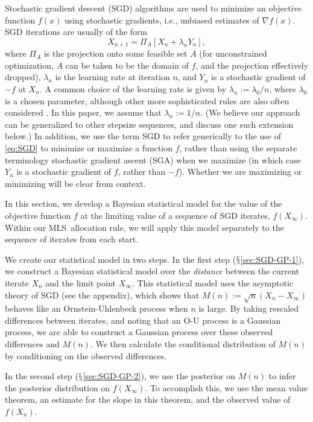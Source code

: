 \documentclass{wscpaperproc}
\theoremstyle{wsc}
\newcommand{\abbrv}{MLS}
\begin{document}
Stochastic gradient descent (SGD) algorithms are used to minimize an objective function $f(x)$ using stochastic gradients, i.e., unbiased estimates of $\nabla f(x)$. SGD iterations are usually of the form
\begin{equation}
X_{n+1}=\Pi_{A}\left[X_{n}+\lambda_{n}Y_{n}\right],\label{eq:SGD}
\end{equation}
where $\Pi_{A}$ is the projection onto some feasible set $A$ (for unconstrained optimization, $A$ can be taken to be the domain of $f$, and the projection effectively dropped),
$\lambda_{n}$ is the learning rate at iteration $n$, and $Y_{n}$ is a stochastic gradient of $-f$ at $X_{n}$.  A common choice of the learning rate is given by $\lambda_{n}:=\lambda_{0}/n$, where $\lambda_{0}$ is a chosen parameter, although other more sophisticated rules are also often considered \cite{powell2007approximate}. In this paper, we assume that  $\lambda_{n}:=1/n$. (We believe our approach can be generalized to other stepsize sequences, and discuss one such extension below.)  In addition, we use the term SGD to refer generically to the use of \eqref{eq:SGD} to minimize or maximize a function $f$, rather than using the separate terminology stochastic gradient ascent (SGA) when we maximize (in which case $Y_n$ is a stochastic gradient of $f$, rather than $-f$).  Whether we are maximizing or minimizing will be clear from context.

In this section, we develop a Bayesian statistical model for the value of the objective function $f$ at the limiting value of a sequence of SGD iterates, $f(X_\infty)$.  Within our \abbrv\ allocation rule, we will apply this model separately to the sequence of iterates from each start.

We create our statistical model in two steps.  
In the first step ($\mathsection$\ref{sec:SGD-GP-1}),  we construct a Bayesian statistical model over the {\it distance} between the current iterate $X_n$ and the limit point $X_\infty$.  This statistical model uses the asymptotic theory of SGD (see the appendix), which shows that $M(n):=\sqrt{n}\left(X_{n}-X_{\infty}\right)$ behaves like an Ornstein-Uhlenbeck process when $n$ is large.
By  taking rescaled differences between iterates, and noting that an O-U process is a Gaussian process, we are able to construct a Gaussian process over these observed differences and $M(n)$. We then calculate the conditional distribution of $M(n)$ by conditioning on the observed differences.

In the second step ($\mathsection$\ref{sec:SGD-GP-2}), we use the posterior on $M(n)$ to infer the posterior distribution on $f(X_\infty)$.  To accomplish this, we use the mean value theorem, an estimate for the slope in this theorem, and the observed value of $f(X_n)$.
\end{document}
